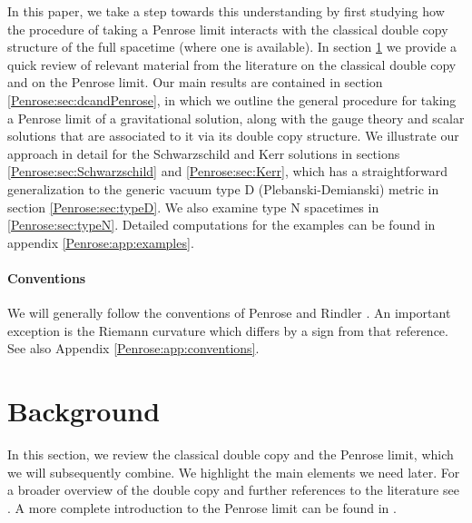 In this paper, we take a step towards this understanding by first studying how the procedure of taking a Penrose
limit interacts with the classical double copy structure of the full spacetime (where one is available). In section
\ref{Penrose:sec:background} we provide a quick review of relevant material from the literature on the classical double
copy and on the Penrose limit. Our main results are contained in section \ref{Penrose:sec:dcandPenrose}, in which we
outline the general procedure for taking a Penrose limit of a gravitational solution, along with the gauge theory
and scalar solutions that are associated to it via its double copy structure. We illustrate our approach in detail for the
Schwarzschild and Kerr solutions in sections \ref{Penrose:sec:Schwarzschild} and \ref{Penrose:sec:Kerr}, which has a
straightforward generalization to the generic vacuum type D (Plebanski-Demianski) metric in section \ref{Penrose:sec:typeD}. We
also examine type N spacetimes in \ref{Penrose:sec:typeN}. Detailed computations for the examples can be found in appendix
\ref{Penrose:app:examples}.

\paragraph*{Conventions} We will generally follow the conventions of Penrose and Rindler \cite{Penrose:1985bww, Penrose:1986ca}. An important exception is the Riemann curvature which differs by a sign from that reference. See also Appendix \ref{Penrose:app:conventions}.

\section{Background}\label{Penrose:sec:background}

In this section, we review the classical double copy and the Penrose limit, which we will subsequently combine. We
highlight the main elements we need later. For a broader overview of the double copy and further references to the
literature see \cite{Bern:2022wqg,Kosower:2022yvp}. A more complete introduction to the Penrose limit can be found in \cite{blau2011plane}.  

